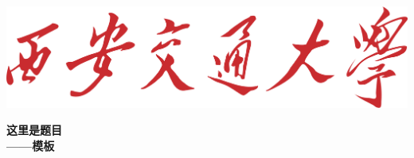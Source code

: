 \documentclass[12pt,a4paper,oneside]{ctexart}
\theoremstyle{nonumberplain}
\theoremstyle{plain}
\theoremstyle{plain}
\theoremstyle{nonumberplain}
\theoremstyle{plain}
\theoremstyle{plain}
\theoremstyle{plain}
\theoremstyle{plain}
\begin{document}
    \begin{titlepage}
        \BgThispage
        \vspace*{0.3cm}
        \begin{center}
            \includegraphics[scale=0.6]{校名.png}
        \end{center}
        \vspace*{2.2cm}
        \begin{center}
            \Huge
            \bfseries
            这里是题目\\——模板
        \end{center}
        \vspace*{6.5cm}
        \begin{center}
            \large
            \begin{tabular}{rp{6cm}<{\centering}}

\end{tabular}
\end{center}
\end{titlepage}
\end{document}
